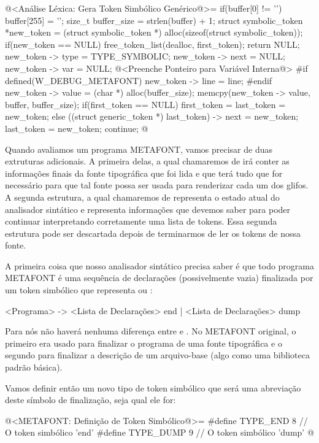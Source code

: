 \iniciocodigo
@<Análise Léxica: Gera Token Simbólico Genérico@>=
if(buffer[0] != '\0'){
  buffer[255] = '\0';
  size_t buffer_size = strlen(buffer) + 1;
  struct symbolic_token *new_token =
     (struct symbolic_token *) alloc(sizeof(struct symbolic_token));
  if(new_token == NULL){
    free_token_list(dealloc, first_token);
    return NULL;
  }
  new_token -> type = TYPE_SYMBOLIC;
  new_token -> next = NULL;
  new_token -> var = NULL;
  @<Preenche Ponteiro para Variável Interna@>
#if defined(W_DEBUG_METAFONT)
  new_token -> line = line;
#endif
  new_token -> value = (char *) alloc(buffer_size);
  memcpy(new_token -> value, buffer, buffer_size);
  if(first_token == NULL)
    first_token = last_token = new_token;
  else{
    ((struct generic_token *) last_token) -> next = new_token;
    last_token = new_token;
  }
  continue;
}
@
\fimcodigo



Quando avaliamos um programa METAFONT, vamos precisar de duas
extruturas adicionais. A primeira delas, a qual chamaremos
de  irá conter as informações finais da
fonte tipográfica que foi lida e que terá tudo que for necessário para
que tal fonte possa ser usada para renderizar cada um dos glifos. A
segunda estrutura, a qual chamaremos de 
representa o estado atual do analisador sintático e representa
informações que devemos saber para poder continuar interpretando
corretamente uma lista de tokens. Essa segunda estrutura pode ser
descartada depois de terminarmos de ler os tokens de nossa fonte.

A primeira coisa que nosso analisador sintático precisa saber é que
todo programa METAFONT é uma sequência de declarações (possivelmente
vazia) finalizada por um token simbólico que
representa  ou :

\alinhaverbatim
<Programa> -> <Lista de Declarações> end | <Lista de Declarações> dump
\alinhanormal

Para nós não haverá nenhuma diferença entre 
e . No METAFONT original, o primeiro era usado para
finalizar o programa de uma fonte tipográfica e o segundo para
finalizar a descrição de um arquivo-base (algo como uma biblioteca
padrão básica).

Vamos definir então um novo tipo de token simbólico que será uma
abreviação deste símbolo de finalização, seja qual ele for:

\iniciocodigo
@<METAFONT: Definição de Token Simbólico@>=
#define TYPE_END             8 // O token simbólico 'end'
#define TYPE_DUMP            9 // O token simbólico 'dump'
@
\fimcodigo

